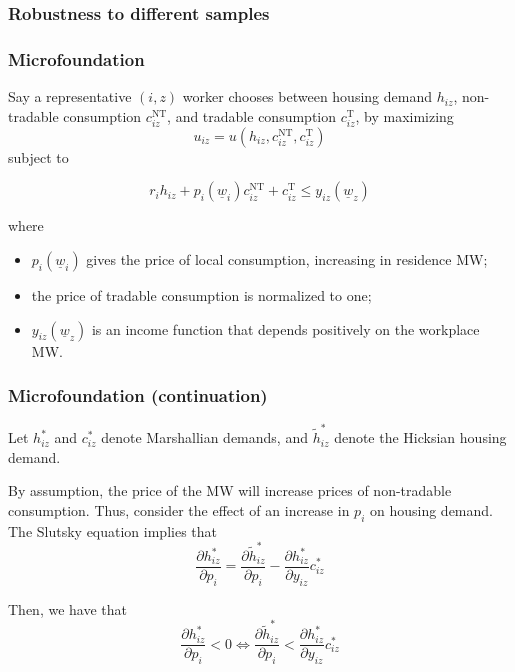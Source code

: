 \documentclass[aspectratio=169, t]{beamer}
\newcommand{\MW}{\underline{w}}
\begin{document}
\begin{frame}[label = robustness_sample]
	\frametitle{Robustness to different samples}
	
	
	
	\hyperlink{robus_sample}{}
\end{frame}

\begin{frame}[label = microfound]
\frametitle{Microfoundation}
Say a representative $(i,z)$ worker chooses between housing demand $h_{iz}$,
non-tradable consumption $c^{\text{NT}}_{iz}$, and tradable consumption $c^{\text{T}}_{iz}$,
by maximizing
\[
u_{iz} = u \left(h_{iz}, c^{\text{NT}}_{iz}, c^{\text{T}}_{iz}\right)
\]
subject to

\[
r_i h_{iz} + p_i(\MW_i) c^{\text{NT}}_{iz} + c^{\text{T}}_{iz} \leq y_{iz}(\MW_z)
\]

where 
\begin{itemize}
    \item $p_i(\MW_i)$ gives the price of local consumption, increasing in residence MW;
    \item the price of tradable consumption is normalized to one;  
    \item $y_{iz}(\MW_z)$ is an income function that depends positively on the workplace MW.
\end{itemize}
\end{frame}

\begin{frame}
\frametitle{Microfoundation (continuation)}

Let $h_{iz}^*$ and $c_{iz}^*$ denote Marshallian demands, and 
$\tilde h_{iz}^*$ denote the Hicksian housing demand.

\vspace{2mm}

By assumption, the price of the MW will increase prices of non-tradable consumption.
Thus, consider the effect of an increase in $p_i$ on housing demand.
The Slutsky equation implies that
\[
\frac{\partial h_{iz}^*}{\partial p_i} 
   = \frac{\partial \tilde h_{iz}^*}{\partial p_i} 
   - \frac{\partial h_{iz}^*}{\partial y_{iz}} c_{iz}^*
\]

Then, we have that 
\[
\frac{\partial h_{iz}^*}{\partial p_i} < 0 \iff 
\frac{\partial \tilde h_{iz}^*}{\partial p_i} 
< \frac{\partial h_{iz}^*}{\partial y_{iz}} c_{iz}^*
\]

\hyperlink{discuss4}{}
\end{frame}
\end{document}
